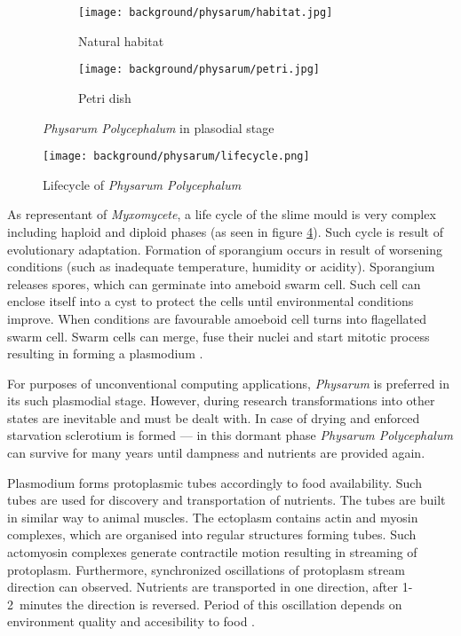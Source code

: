 \begin{figure}
  \centering
  \begin{subfigure}{0.45\textwidth}
    \centering
    \texttt{[image: background/physarum/habitat.jpg]}
    \caption{Natural habitat \cite{TODO}}
    \label{figure:bp_habitat}
  \end{subfigure}
  \begin{subfigure}{0.45\textwidth}
    \centering
    \texttt{[image: background/physarum/petri.jpg]}
    \caption{Petri dish}
    \label{figure:bp_petri}
  \end{subfigure}
  \caption{\textit{Physarum Polycephalum} in plasodial stage}
\end{figure}

\begin{figure}
  \centering
  \texttt{[image: background/physarum/lifecycle.png]}
  \caption{Lifecycle of \textit{Physarum Polycephalum} \cite{TODO}}
  \label{figure:bp_lifecycle}
\end{figure}

As representant of \textit{Myxomycete}, a life cycle of the slime mould is very complex including haploid and diploid phases (as seen in figure \ref{figure:bp_lifecycle}). Such cycle is result of evolutionary adaptation. Formation of sporangium occurs in result of worsening conditions (such as inadequate temperature, humidity or acidity). Sporangium releases spores, which can germinate into ameboid swarm cell. Such cell can enclose itself into a cyst to protect the cells until environmental conditions improve. When conditions are favourable amoeboid cell turns into flagellated swarm cell. Swarm cells can merge, fuse their nuclei and start mitotic process resulting in forming a plasmodium \cite{jones2015pattern}.

For purposes of unconventional computing applications, \textit{Physarum} is preferred in its such plasmodial stage. However, during research transformations into other states are inevitable and must be dealt with. In case of drying and enforced starvation sclerotium is formed --- in this dormant phase \textit{Physarum Polycephalum} can survive for many years until dampness and nutrients are provided again.

Plasmodium forms protoplasmic tubes accordingly to food availability. Such tubes are used for discovery and transportation of nutrients. The tubes are built in similar way to animal muscles. The ectoplasm contains actin and myosin complexes, which are organised into regular structures forming tubes. Such actomyosin complexes generate contractile motion resulting in streaming of protoplasm. Furthermore, synchronized oscillations of protoplasm stream direction can observed. Nutrients are transported in one direction, after 1-2~minutes the direction is reversed. Period of this oscillation depends on environment quality and accesibility to food \cite{wohlfarth1979oscillatory}. 

